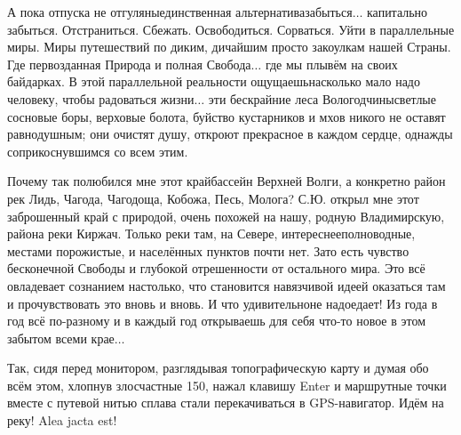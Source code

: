 А пока отпуска не отгуляны\mdash единственная альтернатива\mdash забыться$\ldots$ капитально забыться. Отстраниться. Сбежать. Освободиться. Сорваться. Уйти в параллельные миры. Миры путешествий по диким, дичайшим просто закоулкам нашей Страны. Где первозданная Природа и полная Свобода$\ldots$ где мы плывём на своих байдарках. В этой параллельной реальности ощущаешь\mdash насколько мало надо человеку, чтобы радоваться жизни$\ldots$ эти бескрайние леса Вологодчины\mdash светлые сосновые боры, верховые болота, буйство кустарников и мхов никого не оставят равнодушным; они очистят душу, откроют прекрасное в каждом сердце, однажды соприкоснувшимся со всем этим. 

Почему так полюбился мне этот край\mdash бассейн Верхней Волги, а конкретно район рек Лидь, Чагода, Чагодоща, Кобожа, Песь, Молога? С.Ю. открыл мне этот заброшенный край с природой, очень похожей на нашу, родную Владимирскую, района реки Киржач. Только реки там, на Севере, интереснее\mdash полноводные, местами порожистые, и населённых пунктов почти нет. Зато есть чувство бесконечной Свободы и глубокой отрешенности от остального мира. Это всё овладевает сознанием настолько, что становится навязчивой идеей оказаться там и прочувствовать это вновь и вновь. И что удивительно\mdash не надоедает! Из года в год всё по-разному и в каждый год открываешь для себя что-то новое в этом забытом всеми крае$\ldots$
 
Так, сидя перед монитором, разглядывая топографическую карту и думая обо всём этом, хлопнув злосчастные 150, нажал клавишу Enter и маршрутные точки вместе с путевой нитью сплава стали перекачиваться в GPS-навигатор. Идём на реку! Alea jacta est!

\begin{center}
\end{center}
